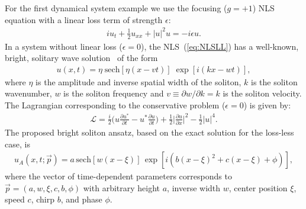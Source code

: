 For the first dynamical system example we use the focusing ($g=+1$) NLS equation with a linear loss term of strength $\epsilon$:
\begin{align}
iu_t + \frac{1}{2} u_{xx} + |u|^2 u = -i  \epsilon  u. 
\label{eq:NLSLL}
\end{align}
In a system without linear loss ($\epsilon = 0$), the NLS~(\ref{eq:NLSLL}) has a well-known, bright, solitary wave solution~\cite{BECBOOK, nonlinsc} of the form 
\begin{align}
u(x,t) = \eta \; \mathrm{sech} [ \eta (x - v t) ] \; \exp [i (k x- w t) ],
\end{align}
where $\eta$ is the amplitude and inverse spatial width of the soliton, $k$ is the soliton wavenumber, $w$ is the soliton frequency and $v \equiv \partial w/ \partial k = k$ is the soliton velocity.
The Lagrangian corresponding to the conservative problem ($\epsilon = 0$) is given by:
\begin{align}
\mathcal{L} = \frac{i}{2} \Bigg( u \frac{\partial u^*}{\partial t} -u^* \frac{\partial u}{\partial t} \Bigg) + \frac{1}{2} \Bigg| \frac{\partial u}{\partial x} \Bigg|^2  - \frac{1}{2} | u|^4.
\label{eq:ConservativeL}
\end{align}
The proposed bright soliton ansatz, based on the exact solution for the loss-less case, is
\begin{align}
u_A(x,t; \vec{p}) = a \, \mathrm{sech}[w(x-\xi)] \, \exp [i(b(x-\xi)^2+ c(x-\xi)+\phi)],
\label{ansatz1}
\end{align}
where the vector of time-dependent parameters corresponds to $\vec{p} = (a, w, \xi, c, b, \phi)$ with arbitrary height $a$, inverse width $w$, center position $\xi$, speed $c$, chirp $b$, and phase $\phi$. 

